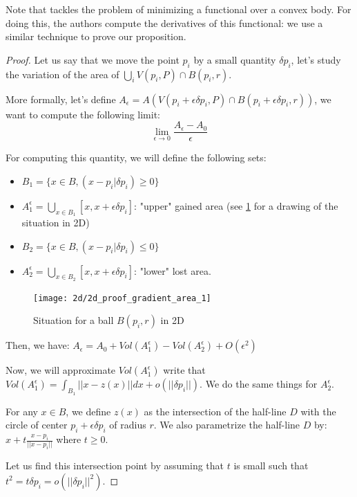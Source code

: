 Note that \cite{lachand2005minimizing} tackles the problem of minimizing a
functional over a convex body. For doing this, the authors compute the
derivatives of this functional: we use a similar technique to prove our
proposition.

\begin{proof}

Let us say that we move the point $ p _i $ by a small quantity $ \delta p_i $,
let's study the variation of the area of $ \bigcup_i V(p_i, P) \cap B(p_i, r) $.

More formally, let's define $ A_{\epsilon} = A(V(p_i + \epsilon \delta p_i, P) \cap
B(p_i + \epsilon \delta p_i, r)) $, we want to compute the following limit:
$$ \lim\limits_{\epsilon \to 0} \frac{A_{\epsilon} - A_0}{\epsilon} $$

For computing this quantity, we will define the following sets:
\begin{itemize}
    \item $ B_1 = \{ x \in B, (x - p_i | \delta p_i) \geq 0\} $
    \item $ A_1^{\epsilon} = \bigcup_{x \in B_1} [x, x + \epsilon \delta p_i] $:
        "upper" gained area (see \ref{fig:demo-gradient} for a drawing of the
        situation in 2D)
    \item $ B_2 = \{ x \in B, (x - p_i | \delta p_i) \leq 0\} $
    \item $ A_2^{\epsilon} = \bigcup_{x \in B_2} [x, x + \epsilon \delta p_i] $:
        "lower" lost area.
\end{itemize}

\begin{figure}[h]
    \centering
    \texttt{[image: 2d/2d\_proof\_gradient\_area\_1]}
    \caption{Situation for a ball $ B(p_i, r) $ in 2D}
    \label{fig:demo-gradient}
\end{figure}

Then, we have: $ A_\epsilon = A_0 + Vol(A_1^\epsilon) - Vol(A_2^\epsilon) +
O(\epsilon^2) $

Now, we will approximate $ Vol(A_1^\epsilon) $ write that $ Vol(A_1^\epsilon) =
\int_{B_1} || x - z(x) || dx + o(||\delta p_i||) $. We do the same things for $
A_2^\epsilon $.

For any $ x \in B $, we define $ z(x) $ as the intersection of the half-line $ D
$ with the circle of center $ p_i + \epsilon \delta p_i $ of radius $ r $. We
also parametrize the half-line $ D $ by: $ x + t \frac{x - p_i}{||x - p_i||} $
where $ t \ge 0 $.

Let us find this intersection point by assuming that $ t $ is small
such that $ t^2 = t \delta p_i = o(||\delta p_i||^2) $.


\end{proof}
